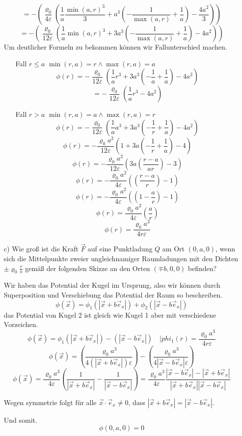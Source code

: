 \documentclass{scrartcl}
\let\*\cdot
\begin{document}
\begin{itemize}
\[=-\left(\frac{\varrho_0}{4 \varepsilon}\left(\frac{1}{a} \frac{{\min(a,r)}^3}{3}+
a^3 \left(-\frac{1}{\max(a,r)}+\frac{1}{a}\right)-\frac{4 a^2}{3}\right)\right)\]
\[=-\left(\frac{\varrho_0}{12 \varepsilon}\left(\frac{1}{a} {\min(a,r)}^3+
3a^3 \left(-\frac{1}{\max(a,r)}+\frac{1}{a}\right)-4 a^2\right)\right)\]
Um deutlicher Formeln zu bekommen können wir Fallunterschied machen.
\begin{itemize}
\item[Fall $r\leq a$]
\(\min(r,a)=r \land \max(r,a)=a\)
\[\phi(r)=-\frac{\varrho_0}{12 \varepsilon}\left(\frac{1}{a} {r}^3+
3a^3 \left(-\frac{1}{a}+\frac{1}{a}\right)-4 a^2\right)\]
\[=-\frac{\varrho_0}{12 \varepsilon}\left(\frac{1}{a} {r}^3-4 a^2\right)\]
\item[Fall $r>a$]
\(\min(r,a)=a \land \max(r,a)=r\)
\[\phi(r)=-\frac{\varrho_0}{12 \varepsilon}\left(\frac{1}{a} {a}^3+
3a^3 \left(-\frac{1}{r}+\frac{1}{a}\right)-4 a^2\right)\]
\[\phi(r)=-\frac{\varrho_0 a^2}{12 \varepsilon}\left(1+
3a \left(-\frac{1}{r}+\frac{1}{a}\right)-4 \right)\]
\[\phi(r)=-\frac{\varrho_0 a^2}{12 \varepsilon}\left(
3a \left(\frac{r-a}{a r}\right)-3 \right)\]
\[\phi(r)=-\frac{\varrho_0 a^2}{4 \varepsilon}\left(
\left(\frac{r-a}{r}\right)-1 \right)\]
\[\phi(r)=-\frac{\varrho_0 a^2}{4 \varepsilon}\left(
\left(1-\frac{a}{r}\right)-1 \right)\]
\[\phi(r)=\frac{\varrho_0 a^2}{4 \varepsilon}\left(
\frac{a}{r} \right)\]
\[\phi(r)=\frac{\varrho_0 a^3}{4 r \varepsilon}\]

\end{itemize}

    \item[c)]
     Wie groß ist die Kraft $\vec{F}$ auf eine Punktladung $Q$ am Ort $(0, a, 0)$, wenn sich die Mittelpunkte
zweier ungleichnamiger Raumladungen mit den Dichten $\pm\varrho_0\frac{r}{a}$ gemäß der folgenden Skizze an
den Orten $(\mp b, 0, 0)$ befinden?
  
Wir haben das Potential der Kugel im Ursprung, also wir können durch Superposition und Verschiebung das Potential der Raum so beschreiben.
\[\phi(\vec{x})=\phi_1(|\vec{x}+b \vec{e}_x|)+\phi_2(|\vec{x}-b \vec{e}_x|)\]
das Potential von Kugel 2 ist gleich wie Kugel 1 aber mit verschiedene Vorzeichen.
\[\phi(\vec{x})=\phi_1(|\vec{x}+b \vec{e}_x|)-(|\vec{x}-b \vec{e}_x|)\quad | phi_1(r)=\frac{\varrho_0 a^3}{4 r \varepsilon}\]
\[\phi(\vec{x})=\left(\frac{\varrho_0 a^3}{4 (|\vec{x}+b \vec{e}_x|)\varepsilon}\right)-\left(\frac{\varrho_0 a^3}{4|\vec{x}-b \vec{e}_x| \varepsilon}\right)\]
\[\phi(\vec{x})=\frac{\varrho_0 a^3}{4\varepsilon}\left(\frac{1}{ |\vec{x}+b \vec{e}_x|}-\frac{1}{|\vec{x}-b \vec{e}_x|}\right)
=\frac{\varrho_0 a^3}{4\varepsilon}\frac{|\vec{x}-b \vec{e}_x|- |\vec{x}+b \vec{e}_x|}{ |\vec{x}+b \vec{e}_x| |\vec{x}-b \vec{e}_x|}\]

Wegen symmetrie folgt für alle $\vec{x}\*\vec{e}_x\neq 0$, dass $|\vec{x}+b \vec{e}_x|=|\vec{x}-b \vec{e}_x|$.

Und somit.
\[\phi(0,a,0)=0\]
\end{itemize}
\end{document}

